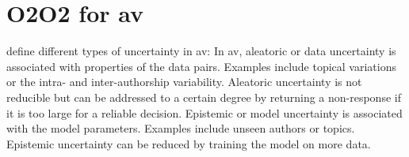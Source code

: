 \section{O2O2 for \ac{av}}
\label{sec:o2o2_av}

\citet{boenninghoff_o2d2_2021} define different types of uncertainty in \ac{av}:
In \ac{av}, aleatoric or data uncertainty is associated with properties of the data pairs.
Examples include topical variations or the intra- and inter-authorship variability.
Aleatoric uncertainty is not reducible but can be addressed to a certain degree 
by returning a non-response if it is too large for a reliable decision.
Epistemic or model uncertainty is associated with the model parameters.
Examples include unseen authors or topics.
Epistemic uncertainty can be reduced by training the model on more data.